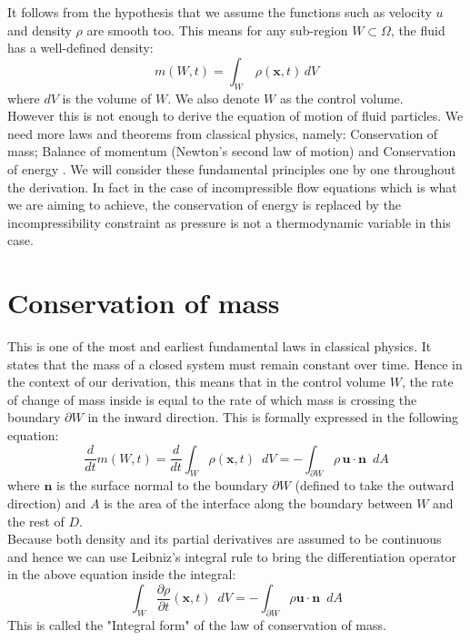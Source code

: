 It follows from the hypothesis that we assume the functions such as velocity $u$ and density $\rho$ are smooth too. This means for any sub-region $W \subset \Omega$, the fluid has a well-defined density:
\begin{equation}
m(W,t) = \int_W\,\rho(\textbf{x},t)\,dV
\end{equation}
where $dV$ is the volume of $W$. We also denote $W$ as the control volume.\\

However this is not enough to derive the equation of motion of fluid particles. We need more laws and theorems from classical physics, namely: Conservation of mass; Balance of momentum (Newton's second law of motion) and Conservation of energy \cite{chorin1990mathematical}. We will consider these fundamental principles one by one throughout the derivation. In fact in the case of incompressible flow equations which is what we are aiming to achieve, the conservation of energy is replaced by the incompressibility constraint as pressure is not a thermodynamic variable in this case.

\section{Conservation of mass}
This is one of the most and earliest fundamental laws in classical physics. It states that the mass of a closed system must remain constant over time. Hence in the context of our derivation, this means that in the control volume $W$, the rate of change of mass inside is equal to the rate of which mass is crossing the boundary $\partial W$ in the inward direction. This is formally expressed in the following equation:\\

\begin{equation}
\dfrac{d}{dt} m(W, t) = \dfrac{d}{d t} \int_W \rho (\textbf{x}, t) \, \, \, dV = - \int_{\partial W} \rho \,\textbf{u} \cdot \textbf{n} \, \, \, dA
\end{equation}
where $\textbf{n}$ is the surface normal to the boundary $\partial W$ (defined to take the outward direction) and $A$ is the area of the interface along the boundary between $W$ and the rest of $D$.\\

Because both density and its partial derivatives are assumed to be continuous and hence we can use Leibniz's integral rule to bring the differentiation operator in the above equation inside the integral:
\begin{equation}
\int_W \dfrac{\partial \rho}{\partial t} (\textbf{x}, t) \, \, \, dV = - \int_{\partial W} \rho \textbf{u} \cdot \textbf{n} \, \, \, dA
\end{equation}
This is called the "Integral form" of the law of conservation of mass.\\

